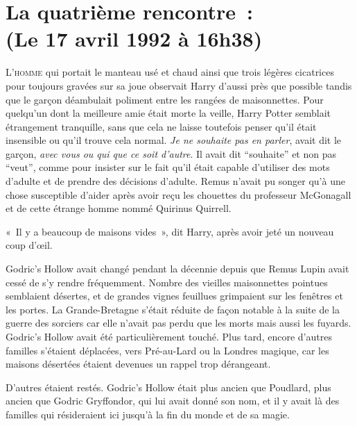 
\section[La quatrième rencontre~:\\
(Le 17 avril 1992 à 16h38)]{La quatrième rencontre~:\\
(Le 17 avril 1992 à 16h38)\protect\footnotemark}

\lettrine{L}{'homme} qui portait le manteau usé et chaud ainsi que trois légères cicatrices pour toujours gravées sur sa joue observait Harry d'aussi près que possible tandis que le garçon déambulait poliment entre les rangées de maisonnettes.
Pour quelqu'un dont la meilleure amie était morte la veille, Harry Potter semblait étrangement tranquille, sans que cela ne laisse toutefois penser qu'il était insensible ou qu'il trouve cela normal.
\emph{Je ne souhaite pas en parler}, avait dit le garçon, \emph{avec vous ou qui que ce soit d'autre}.
Il avait dit “souhaite” et non pas “veut”, comme pour insister sur le fait qu'il était capable d'utiliser des mots d'adulte et de prendre des décisions d'adulte.
Remus n'avait pu songer qu'à une chose susceptible d'aider après avoir reçu les chouettes du professeur McGonagall et de cette étrange homme nommé Quirinus Quirrell.

«~Il y a beaucoup de maisons vides~», dit Harry, après avoir jeté un nouveau coup d'œil.

Godric's Hollow avait changé pendant la décennie depuis que Remus Lupin avait cessé de s'y rendre fréquemment.
Nombre des vieilles maisonnettes pointues semblaient désertes, et de grandes vignes feuillues grimpaient sur les fenêtres et les portes.
La Grande-Bretagne s'était réduite de façon notable à la suite de la guerre des sorciers car elle n'avait pas perdu que les morts mais aussi les fuyards.
Godric's Hollow avait été particulièrement touché.
Plus tard, encore d'autres familles s'étaient déplacées, vers Pré-au-Lard ou la Londres magique, car les maisons désertées étaient devenues un rappel trop dérangeant.

D'autres étaient restés.
Godric's Hollow était plus ancien que Poudlard, plus ancien que Godric Gryffondor, qui lui avait donné son nom, et il y avait là des familles qui résideraient ici jusqu'à la fin du monde et de sa magie.

